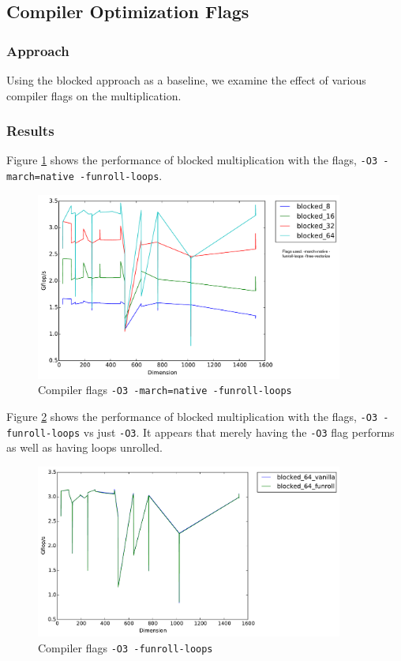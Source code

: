 \documentclass[11pt]{article}
\theoremstyle{plain}
\theoremstyle{definition}
\begin{document}
\subsection{Compiler Optimization Flags}
\subsubsection{Approach}
Using the blocked approach as a baseline, we examine the effect of various compiler flags on the multiplication.
\subsubsection{Results}
Figure \ref{all_optimized_blocked} shows the performance of blocked multiplication with the flags, \texttt{-O3 -march=native -funroll-loops}.
\begin{figure}[H]
    \includegraphics[width=0.9\textwidth]{timing_flags_blocked.pdf}
    \caption{Compiler flags \texttt{-O3 -march=native -funroll-loops}}
    \label{all_optimized_blocked}
\end{figure} 

Figure \ref{funroll_vanilla} shows the performance of blocked multiplication with the flags, \texttt{-O3 -funroll-loops} vs just \texttt{-O3}. It appears that merely having the \texttt{-O3} flag performs as well as having loops unrolled. 
\begin{figure}[H]
    \includegraphics[width=0.9\textwidth]{timing_funroll_vanilla.pdf}
    \caption{Compiler flags \texttt{-O3 -funroll-loops}}
    \label{funroll_vanilla}
\end{figure} 
\end{document}
